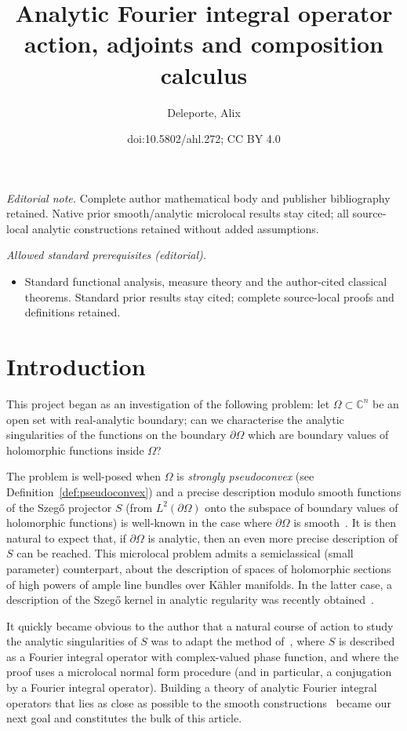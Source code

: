 \documentclass[10pt]{amsart}
\title{Analytic Fourier integral operator action, adjoints and composition calculus}
\author{Deleporte, Alix}
\date{doi:10.5802/ahl.272; CC BY 4.0}
\theoremstyle{definition}\newtheorem{defi}[theo]{Definition}\newtheorem{rema}[theo]{Remark}\newtheorem{exam}[theo]{Example}\newtheorem{exem}[theo]{Example}\newtheorem{nota}[theo]{Notation}
\newcommand\1{\mathds{1}}
\newcommand{\C}{\mathbb{C}}
\begin{document}
\maketitle
\noindent\textit{Editorial note.} Complete author mathematical body and publisher bibliography retained. Native prior smooth/analytic microlocal results stay cited; all source-local analytic constructions retained without added assumptions.\par\medskip
\noindent\textit{Allowed standard prerequisites (editorial).}\begin{itemize}
\item Standard functional analysis, measure theory and the author-cited classical theorems. Standard prior results stay cited; complete source-local proofs and definitions retained.
\end{itemize}\medskip

\section{Introduction}
\label{sec:introduction}
This project began as an investigation of the following problem: let $\Omega\subset \C^n$ be an open set with real-analytic boundary; can we characterise the analytic singularities of the functions on the boundary $\partial \Omega$ which are boundary values of holomorphic functions inside $\Omega$?

The problem is well-posed when $\Omega$ is \emph{strongly pseudoconvex} (see Definition~\ref{def:pseudoconvex}) and a precise description modulo smooth functions of the Szeg\H{o} projector $S$ (from $L^2(\partial \Omega)$ onto the subspace of boundary values of holomorphic functions) is well-known in the case where $\partial \Omega$ is smooth~\cite{boutet_de_monvel_sur_1975,fefferman_bergman_1976}. It is then natural to expect that, if $\partial \Omega$ is analytic, then an even more precise description of $S$ can be reached. This microlocal problem admits a semiclassical (small parameter) counterpart, about the description of spaces of holomorphic sections of high powers of ample line bundles over K\"ahler manifolds. In the latter case, a description of the Szeg\H{o} kernel in analytic regularity was recently obtained~\cite{charles_analytic_2021,deleporte_toeplitz_2018,deleporte_direct_2024,hezari_off-diagonal_2017,hezari_property_2021,rouby_analytic_2018}.

It quickly became obvious to the author that a natural course of action to study the analytic singularities of $S$ was to adapt the method of~\cite{boutet_de_monvel_sur_1975}, where $S$ is described as a {Fourier integral operator} with complex-valued phase function, and where the proof uses a microlocal normal form procedure (and in particular, a conjugation by a {Fourier integral operator}). Building a theory of analytic {Fourier integral operators} that lies as close as possible to the smooth constructions~\cite{hormander_analysis_1985} became our next goal and constitutes the bulk of this article.
\end{document}
